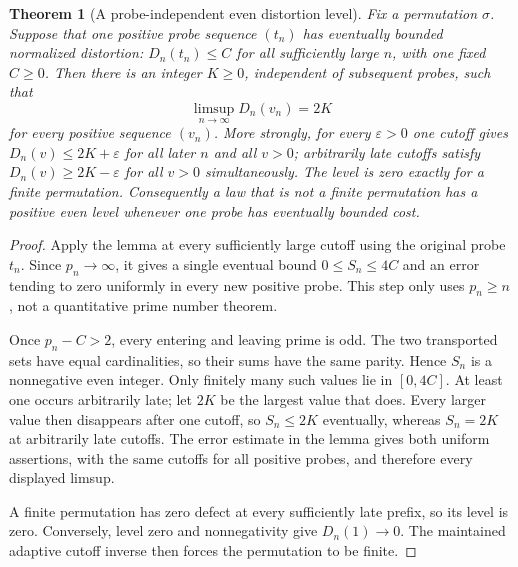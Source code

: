 \documentclass[11pt]{article}
\newtheorem{theorem}{Theorem}[section]
\theoremstyle{definition}
\begin{document}
\begin{theorem}[A probe-independent even distortion level]
Fix a permutation $\sigma$. Suppose that one positive probe sequence
$(t_n)$ has eventually bounded normalized distortion:
$D_n(t_n)\le C$ for all sufficiently large $n$, with one fixed $C\ge0$.
Then there is an integer $K\ge0$, independent of subsequent probes,
such that
\[
 \limsup_{n\to\infty}D_n(v_n)=2K
\]
for every positive sequence $(v_n)$. More strongly, for every
$\varepsilon>0$ one cutoff gives $D_n(v)\le2K+\varepsilon$
for all later $n$ and all $v>0$; arbitrarily late cutoffs satisfy
$D_n(v)\ge2K-\varepsilon$ for \emph{all} $v>0$ simultaneously.
The level is zero exactly for a finite permutation.
Consequently a law that is \emph{not a finite permutation} has a
positive even level whenever one probe has eventually bounded cost.
\end{theorem}
\begin{proof}
Apply the lemma at every sufficiently large cutoff using the original
probe $t_n$. Since $p_n\to\infty$, it gives a single eventual bound
$0\le S_n\le4C$ and an error tending to zero uniformly in every new
positive probe. This step only uses $p_n\ge n$, not a quantitative
prime number theorem.

Once $p_n-C>2$, every entering and leaving prime is odd.
The two transported sets have equal cardinalities, so their sums
have the same parity. Hence $S_n$ is a nonnegative even integer.
Only finitely many such values lie in $[0,4C]$. At least one occurs
arbitrarily late; let $2K$ be the largest value that does.
Every larger value then disappears after one cutoff, so $S_n\le2K$
eventually, whereas $S_n=2K$ at arbitrarily late cutoffs.
The error estimate in the lemma gives both uniform assertions,
with the same cutoffs for all positive probes, and therefore every
displayed limsup.

A finite permutation has zero defect at every sufficiently late
prefix, so its level is zero. Conversely, level zero and
nonnegativity give $D_n(1)\to0$. The maintained adaptive cutoff
inverse then forces the permutation to be finite.
\end{proof}
\end{document}
